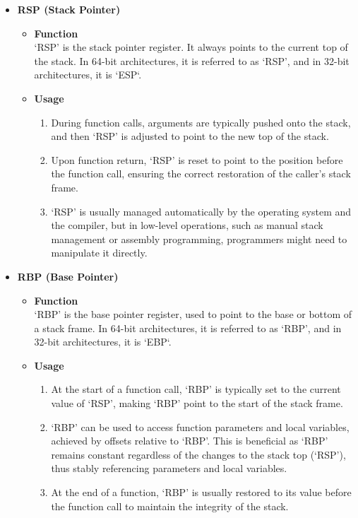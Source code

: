 \documentclass{article}
\begin{document}
\begin{itemize}
    \item \textbf{RSP (Stack Pointer)}
        \begin{itemize}
            \item \textbf{Function}\\
            ‘RSP’ is the stack pointer register. It always points to the current top of the stack. In 64-bit architectures, it is referred to as ‘RSP’, and in 32-bit architectures, it is `ESP`.
            \item \textbf{Usage}
            \begin{enumerate}
                \item During function calls, arguments are typically pushed onto the stack, and then ‘RSP’ is adjusted to point to the new top of the stack.
                \item Upon function return, ‘RSP’ is reset to point to the position before the function call, ensuring the correct restoration of the caller's stack frame.
                \item ‘RSP’ is usually managed automatically by the operating system and the compiler, but in low-level operations, such as manual stack management or assembly programming, programmers might need to manipulate it directly.
            \end{enumerate}
            
        \end{itemize}

    \item \textbf{RBP (Base Pointer)}
        \begin{itemize}
            \item \textbf{Function}\\
            ‘RBP’ is the base pointer register, used to point to the base or bottom of a stack frame. In 64-bit architectures, it is referred to as ‘RBP’, and in 32-bit architectures, it is `EBP`.
            \item \textbf{Usage}
            \begin{enumerate}
                \item At the start of a function call, ‘RBP’ is typically set to the current value of ‘RSP’, making ‘RBP’ point to the start of the stack frame.
                \item ‘RBP’ can be used to access function parameters and local variables, achieved by offsets relative to ‘RBP’. This is beneficial as ‘RBP’ remains constant regardless of the changes to the stack top (‘RSP’), thus stably referencing parameters and local variables.
                \item At the end of a function, ‘RBP’ is usually restored to its value before the function call to maintain the integrity of the stack.
            \end{enumerate}  
        \end{itemize}
\end{itemize}
\end{document}
